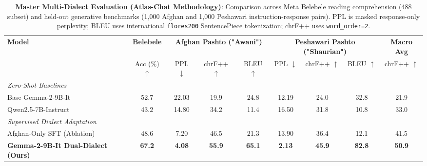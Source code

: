 \begin{table}[t]
\centering
\small
\setlength{\tabcolsep}{4.5pt}
\begin{tabular}{l|c|ccc|ccc|c}
\toprule
\textbf{Model} & \textbf{Belebele} & \multicolumn{3}{c|}{\textbf{Afghan Pashto ("Awani")}} & \multicolumn{3}{c|}{\textbf{Peshawari Pashto ("Shaurian")}} & \textbf{Macro Avg} \\
& Acc (\%) $\uparrow$ & PPL $\downarrow$ & chrF++ $\uparrow$ & BLEU $\uparrow$ & PPL $\downarrow$ & chrF++ $\uparrow$ & BLEU $\uparrow$ & chrF++ $\uparrow$ \\
\midrule
\textit{Zero-Shot Baselines} & & & & & & & & \\
Base Gemma-2-9B-It & 52.7 & 22.03 & 19.9 & 24.8 & 12.19 & 24.0 & 32.8 & 21.9 \\
Qwen2.5-7B-Instruct & 43.2 & 14.80 & 34.2 & 11.4 & 16.50 & 31.8 & 10.8 & 33.0 \\
\midrule
\textit{Supervised Dialect Adaptation} & & & & & & & & \\
Afghan-Only SFT (Ablation) & 48.6 & 7.20 & 46.5 & 21.3 & 13.90 & 36.4 & 12.1 & 41.5 \\
\textbf{Gemma-2-9B-It Dual-Dialect (Ours)} & \textbf{67.2} & \textbf{4.08} & \textbf{55.9} & \textbf{65.1} & \textbf{2.13} & \textbf{45.9} & \textbf{82.8} & \textbf{50.9} \\
\bottomrule
\end{tabular}
\caption{\textbf{Master Multi-Dialect Evaluation (Atlas-Chat Methodology)}: Comparison across Meta Belebele reading comprehension (488 subset) and held-out generative benchmarks (1,000 Afghan and 1,000 Peshawari instruction-response pairs). PPL is masked response-only perplexity; BLEU uses international \texttt{flores200} SentencePiece tokenization; chrF++ uses \texttt{word\_order=2}.}
\label{tab:master_table2_results}
\end{table}
